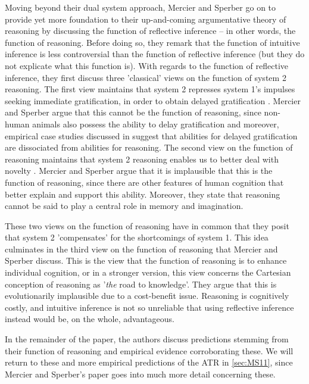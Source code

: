 Moving beyond their dual system approach, Mercier and Sperber go on to provide yet more foundation to their up-and-coming argumentative theory of reasoning by discussing the function of reflective inference -- in other words, the function of reasoning.
Before doing so, they remark that the function of intuitive inference is less controversial than the function of reflective inference (but they do not explicate what this function is).
With regards to the function of reflective inference, they first discuss three 'classical' views on the function of system 2 reasoning.
The first view maintains that system 2 represses system 1's impulses seeking immediate gratification, in order to obtain delayed gratification \citep{Sloman96}. Mercier and Sperber argue that this cannot be the function of reasoning, since non-human animals also possess the ability to delay gratification and moreover, empirical case studies discussed in \citet{Damasio94} suggest that abilities for delayed gratification are dissociated from abilities for reasoning.
The second view on the function of reasoning maintains that system 2 reasoning enables us to better deal with novelty \citep{EvansOver1996}. Mercier and Sperber argue that it is implausible that this is the function of reasoning, since there are other features of human cognition that better explain and support this ability. Moreover, they state that reasoning cannot be said to play a central role in memory and imagination.

These two views on the function of reasoning have in common that they posit that system 2 'compensates' for the shortcomings of system 1.
This idea culminates in the third view on the function of reasoning that Mercier and Sperber discuss. This is the view that the function of reasoning is to enhance individual cognition, or in a stronger version, this view concerns the Cartesian conception of reasoning as '\emph{the} road to knowledge'.
They argue that this is evolutionarily implausible due to a cost-benefit issue.
Reasoning is cognitively costly, and intuitive inference is not so unreliable that using reflective inference instead would be, on the whole, advantageous.

In the remainder of the paper, the authors discuss predictions stemming from their function of reasoning and empirical evidence corroborating these. We will return to these and more empirical predictions of the ATR in \cref{sec:MS11}, since Mercier and Sperber's \citeyear{MS11} paper goes into much more detail concerning these.

